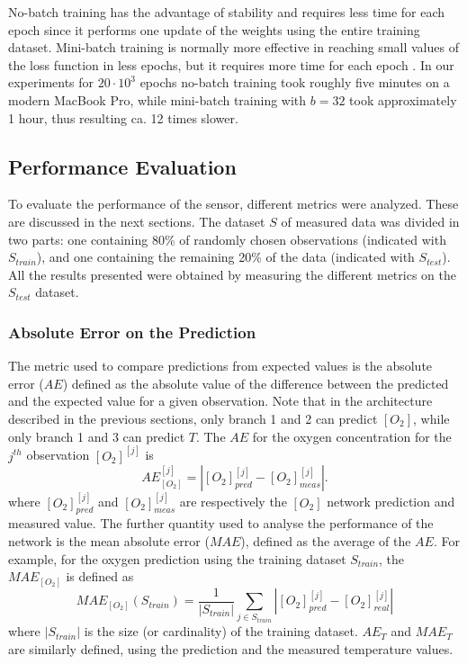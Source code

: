 \documentclass[final,5p,times,twocolumn]{elsarticle}
\begin{document}
No-batch training has the advantage of stability and requires less time for each epoch since it performs one update of the weights using the entire training dataset. Mini-batch training is normally more effective in reaching small values of the loss function in less epochs, but it requires more time for each epoch \cite{Michelucci2017}. In our experiments for $20 \cdot 10^3$ epochs no-batch training took roughly five minutes on a modern MacBook Pro, while mini-batch training with $b=32$ took approximately 1 hour, thus resulting ca. 12 times slower. 


\subsection{Performance Evaluation}

To evaluate the performance of the sensor, different metrics were analyzed. These are discussed in the next sections. The dataset $S$ of measured data was divided in two parts: one containing 80\% of randomly chosen observations (indicated with $S_{train}$), and one containing the remaining 20\% of the data (indicated with $S_{test}$). All the results presented were obtained by measuring the different metrics on the $S_{test}$ dataset.


\subsubsection{Absolute Error on the Prediction}

The metric used to compare predictions from expected values is the absolute error ($AE$) defined as the absolute value of the difference between the predicted and the expected value for a given observation. Note that in the architecture described in the previous sections, only branch 1 and 2 can predict $[O_2]$, 
while only branch 1 and 3 can predict $T$. The $AE$ for the oxygen concentration for the $j^{th}$ observation $[O_2]^{[j]}$  is 
\begin{equation}
\label{AE}
AE^{{[j]}}_{[O_2]} = |[O_2]^{{[j]}}_{pred}-[O_2]^{[j]}_{meas}|.
\end{equation}
where $[O_2]^{{[j]}}_{pred}$ and $[O_2]^{{[j]}}_{meas}$ are respectively the $[O_2]$ network prediction and measured value.
The further quantity used to analyse the performance of the network is the mean absolute error ($MAE$), defined as the average of the $AE$. For example, for the oxygen prediction using the training dataset $S_{train}$, the $MAE_{[O_2]}$ is defined as 
\begin{equation}
\label{MAE}
MAE_{[O_2]}(S_{train}) = \frac{1}{|S_{train}|} \sum_{j \in S_{train}}|[O_2]_{pred}^{[j]}-[O_2]_{real}^{[j]}|
\end{equation}
where $|S_{train}|$ is the size (or cardinality) of the training dataset. 
$AE_{T}$ and $MAE_T$ are similarly defined, using the prediction and the measured temperature values.
\end{document}

